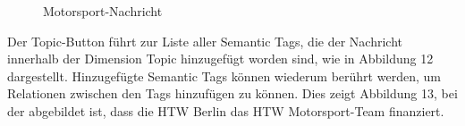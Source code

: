 \hspace*{1em}
\begin{minipage}{0.47\linewidth}
	\begin{figure}[H]
		\centering
		\caption{Motorsport-Nachricht}
		\label{fig:motorsportNachricht}
	\end{figure}
\end{minipage}
\newline\newline\newline Der Topic-Button führt zur Liste aller Semantic Tags, die der Nachricht innerhalb der Dimension Topic hinzugefügt worden sind, wie in Abbildung 12 dargestellt. Hinzugefügte Semantic Tags können wiederum berührt werden, um Relationen zwischen den Tags hinzufügen zu können. Dies zeigt Abbildung 13, bei der abgebildet ist, dass die HTW Berlin das HTW Motorsport-Team finanziert. 
\newpage

